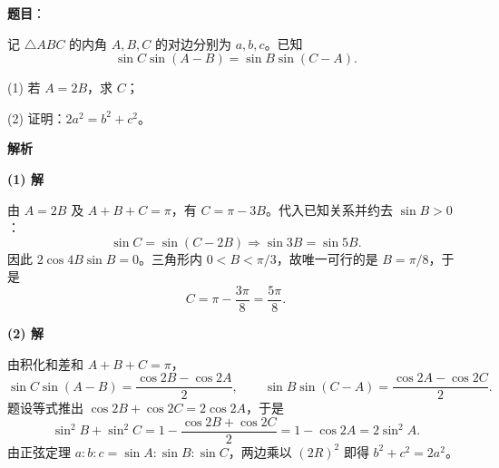 \begin{answer}

\textbf{题目}：

记 $\triangle ABC$ 的内角 $A,B,C$ 的对边分别为 $a,b,c$。已知
\nopagebreak[4]
\[
\sin C\sin(A-B)=\sin B\sin(C-A).
\]

(1) 若 $A=2B$，求 $C$；

(2) 证明：$2a^2=b^2+c^2$。

\textbf{解析}

\textbf{(1) 解}

由 $A=2B$ 及 $A+B+C=\pi$，有 $C=\pi-3B$。代入已知关系并约去 $\sin B>0$：
\nopagebreak[4]
\[
\sin C=\sin(C-2B)
\Longrightarrow \sin3B=\sin5B.
\]
因此 $2\cos4B\sin B=0$。三角形内 $0<B<\pi/3$，故唯一可行的是 $B=\pi/8$，于是
\nopagebreak[4]
\[
C=\pi-\frac{3\pi}{8}=\frac{5\pi}{8}.
\]

\textbf{(2) 解}

由积化和差和 $A+B+C=\pi$，
\nopagebreak[4]
\[
\sin C\sin(A-B)=\frac{\cos2B-\cos2A}{2},\qquad
\sin B\sin(C-A)=\frac{\cos2A-\cos2C}{2}.
\]
题设等式推出 $\cos2B+\cos2C=2\cos2A$，于是
\nopagebreak[4]
\[
\sin^2B+\sin^2C
=1-\frac{\cos2B+\cos2C}{2}
=1-\cos2A
=2\sin^2A.
\]
由正弦定理 $a:b:c=\sin A:\sin B:\sin C$，两边乘以 $(2R)^2$ 即得 $b^2+c^2=2a^2$。



\end{answer}

